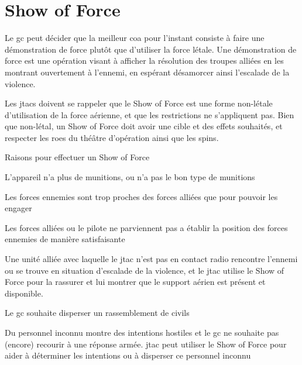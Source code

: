\section{Show of Force}

Le \gls{gc} peut décider que la meilleur \gls{coa} pour l'instant consiste à faire une démonstration de force plutôt que d'utiliser la force létale. Une démonstration de force est une opération visant à afficher la résolution des troupes alliées en les montrant ouvertement à l'ennemi, en espérant désamorcer ainsi l'escalade de la violence.

Les \glspl{jtac} doivent se rappeler que le Show of Force est une forme non-létale d'utilisation de la force aérienne, et que les restrictions ne s'appliquent pas. Bien que non-létal, un Show of Force doit avoir une cible et des effets souhaités, et respecter les \glspl{roe} du théâtre d'opération ainsi que les \gls{spins}.

\e
	\item Raisons pour effectuer un Show of Force
	\ee
		\item L'appareil n'a plus de munitions, ou n'a pas le bon type de munitions
		\item Les forces ennemies sont trop proches des forces alliées que pour pouvoir les engager
		\item Les forces alliées ou le pilote ne parviennent pas a établir la position des forces ennemies de manière satisfaisante
		\item Une unité alliée avec laquelle le \gls{jtac} n'est pas en contact radio rencontre l'ennemi ou se trouve en situation d'escalade de la violence, et le \gls{jtac} utilise le Show of Force pour la rassurer et lui montrer que le support aérien est présent et disponible.
		\item Le \gls{gc} souhaite disperser un rassemblement de civils
		\item Du personnel inconnu montre des intentions hostiles et le \gls{gc} ne souhaite pas (encore) recourir à une réponse armée. \gls{jtac} peut utiliser le Show of Force pour aider à déterminer les intentions ou à disperser ce personnel inconnu
	\ed
\ed
